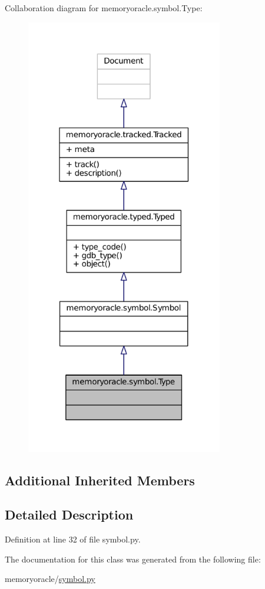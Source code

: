 Collaboration diagram for memoryoracle.\+symbol.\+Type\+:
\nopagebreak
\begin{figure}[H]
\begin{center}
\leavevmode
\includegraphics[width=244pt]{classmemoryoracle_1_1symbol_1_1Type__coll__graph}
\end{center}
\end{figure}
\subsection*{Additional Inherited Members}


\subsection{Detailed Description}


Definition at line 32 of file symbol.\+py.



The documentation for this class was generated from the following file\+:\begin{DoxyCompactItemize}
\item 
memoryoracle/\hyperlink{symbol_8py}{symbol.\+py}\end{DoxyCompactItemize}
